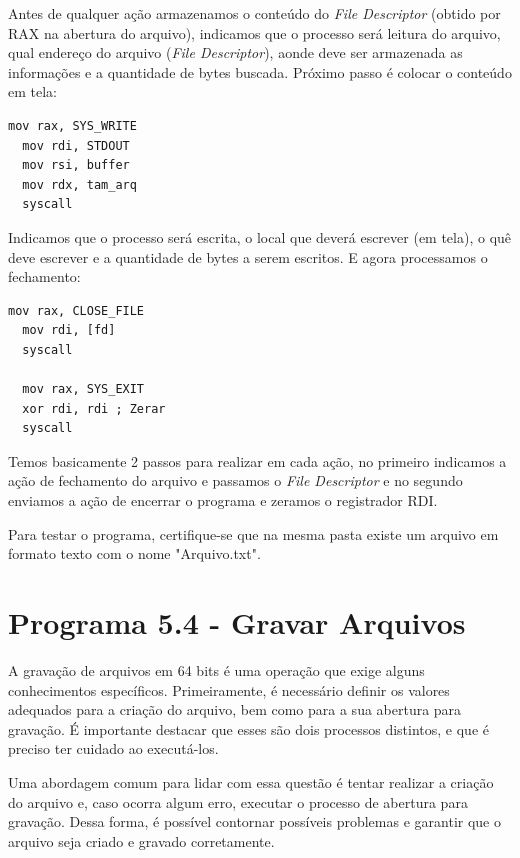 Antes de qualquer ação armazenamos o conteúdo do \textit{File Descriptor} (obtido por RAX na abertura do arquivo), indicamos que o processo será leitura do arquivo, qual endereço do arquivo (\textit{File Descriptor}), aonde deve ser armazenada as informações e a quantidade de bytes buscada. Próximo passo é colocar o conteúdo em tela:
\begin{lstlisting}[]
  mov rax, SYS_WRITE
  mov rdi, STDOUT
  mov rsi, buffer
  mov rdx, tam_arq
  syscall
\end{lstlisting}

Indicamos que o processo será escrita, o local que deverá escrever (em tela), o quê deve escrever e a quantidade de bytes a serem escritos. E agora processamos o fechamento:
\begin{lstlisting}[]
  mov rax, CLOSE_FILE
  mov rdi, [fd]
  syscall

  mov rax, SYS_EXIT
  xor rdi, rdi ; Zerar
  syscall
\end{lstlisting}

Temos basicamente 2 passos para realizar em cada ação, no primeiro indicamos a ação de fechamento do arquivo e passamos o \textit{File Descriptor} e no segundo enviamos a ação de encerrar o programa e zeramos o registrador RDI.

Para testar o programa, certifique-se que na mesma pasta existe um arquivo em formato texto com o nome "Arquivo.txt".

\section{Programa 5.4 - Gravar Arquivos}
A gravação de arquivos em 64 bits é uma operação que exige alguns conhecimentos específicos. Primeiramente, é necessário definir os valores adequados para a criação do arquivo, bem como para a sua abertura para gravação. É importante destacar que esses são dois processos distintos, e que é preciso ter cuidado ao executá-los.

Uma abordagem comum para lidar com essa questão é tentar realizar a criação do arquivo e, caso ocorra algum erro, executar o processo de abertura para gravação. Dessa forma, é possível contornar possíveis problemas e garantir que o arquivo seja criado e gravado corretamente.

